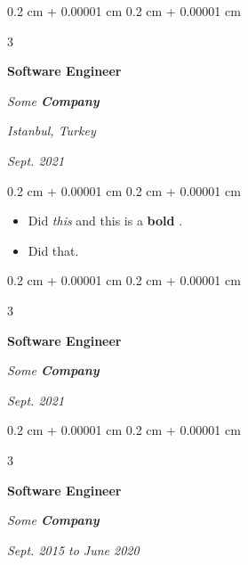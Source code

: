 \documentclass[10pt, letterpaper]{article}
\newenvironment{highlights}{
    \begin{itemize}[
        topsep=0.10 cm,
        parsep=0.10 cm,
        partopsep=0pt,
        itemsep=0pt,
        leftmargin=0.4 cm + 10pt + 0.6 cm
    ]
}{
    \end{itemize}
} %
\newenvironment{onecolentry}{
    \begin{adjustwidth}{
        0.2 cm + 0.00001 cm
    }{
        0.2 cm + 0.00001 cm
    }
}{
    \end{adjustwidth}
} %
\newenvironment{threecolentry}[3][]{
    \onecolentry
    \def\thirdColumn{#3}
    \setcolumnwidth{0.6 cm, \fill, 4.5 cm}
    \begin{paracol}{3}
    #2 \switchcolumn
}{
    \switchcolumn \raggedleft \thirdColumn
    \end{paracol}
    \endonecolentry
} %
\let\hrefWithoutArrow\href
\renewcommand{\href}[2]{\hrefWithoutArrow{#1}{\mbox{\ifthenelse{\equal{#2}{}}{ }{#2 }\raisebox{.15ex}{\footnotesize \faExternalLink*}}}}
\begin{document}
        \vspace{0.2 cm-3px}

        \begin{threecolentry}{
            \vspace*{\fill}
            \textbullet
            \vspace*{3px}
            \vspace*{\fill}
        }{
        \textit{Istanbul, Turkey}    
            
        \textit{Sept. 2021}}
            \textbf{Software Engineer}
            
            \textit{Some \textbf{Company}}
        \end{threecolentry}

        \vspace{0.10 cm-3px}
        \begin{onecolentry}
            \begin{highlights}
                \item Did \textit{this} and this is a \textbf{bold} \href{https://example.com}{link}.
                \item Did that.
            \end{highlights}
        \end{onecolentry}


        \vspace{0.2 cm-3px}

        \begin{threecolentry}{
            \vspace*{\fill}
            \textbullet
            \vspace*{3px}
            \vspace*{\fill}
        }{
            
            
        \textit{Sept. 2021}}
            \textbf{Software Engineer}
            
            \textit{Some \textbf{Company}}
        \end{threecolentry}



        \vspace{0.2 cm-3px}

        \begin{threecolentry}{
            \vspace*{\fill}
            \textbullet
            \vspace*{3px}
            \vspace*{\fill}
        }{
            
            
        \textit{Sept. 2015 to June 2020}}
            \textbf{Software Engineer}
            
            \textit{Some \textbf{Company}}
        \end{threecolentry}
\end{document}
